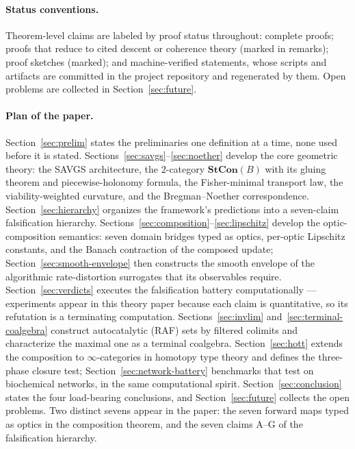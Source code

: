 \documentclass[11pt,a4paper]{article}
\theoremstyle{plain}
\theoremstyle{definition}
\theoremstyle{remark}
\begin{document}
\paragraph{Status conventions.}
Theorem-level claims are labeled by proof status throughout:
complete proofs; proofs that reduce to cited descent or coherence
theory (marked in remarks); proof sketches (marked); and
machine-verified statements, whose scripts and artifacts are
committed in the project repository and regenerated by them. Open
problems are collected in Section~\ref{sec:future}.

\paragraph{Plan of the paper.}
Section~\ref{sec:prelim} states the preliminaries one definition at
a time, none used before it is stated.
Sections~\ref{sec:savgs}--\ref{sec:noether} develop the core
geometric theory: the SAVGS architecture, the $2$-category
$\mathbf{StCon}(B)$ with its gluing theorem and piecewise-holonomy
formula, the Fisher-minimal transport law, the viability-weighted
curvature, and the Bregman--Noether correspondence.
Section~\ref{sec:hierarchy} organizes the framework's predictions
into a seven-claim falsification hierarchy.
Sections~\ref{sec:composition}--\ref{sec:lipschitz} develop the
optic-composition semantics: seven domain bridges typed as optics,
per-optic Lipschitz constants, and the Banach contraction of the
composed update; Section~\ref{sec:smooth-envelope} then constructs
the smooth envelope of the algorithmic rate-distortion surrogates
that its observables require. Section~\ref{sec:verdicts} executes
the falsification battery computationally --- experiments appear in
this theory paper because each claim is quantitative, so its
refutation is a terminating computation.
Sections~\ref{sec:invlim} and~\ref{sec:terminal-coalgebra}
construct autocatalytic (RAF) sets by filtered colimits and
characterize the maximal one as a terminal coalgebra.
Section~\ref{sec:hott} extends the composition to
$\infty$-categories in homotopy type theory and defines the
three-phase closure test; Section~\ref{sec:network-battery}
benchmarks that test on biochemical networks, in the same
computational spirit. Section~\ref{sec:conclusion} states the four
load-bearing conclusions, and Section~\ref{sec:future} collects
the open problems. Two distinct sevens appear in the paper: the
seven forward maps typed as optics in the composition theorem, and
the seven claims A--G of the falsification hierarchy.
\end{document}
